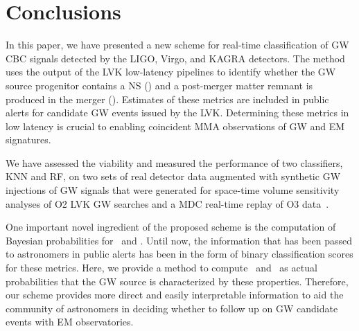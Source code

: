 \section{Conclusions\label{conclusions}}


In this paper, we have presented a new scheme for real-time classification of \ac{GW} \ac{CBC} signals detected by the LIGO, Virgo, and KAGRA detectors. The method uses the
output of the \ac{LVK} low-latency pipelines to identify whether the GW source progenitor contains a \ac{NS} (\hasns) and a post-merger matter remnant is produced in the merger
(\hasrem). Estimates of these metrics are included in public alerts for candidate \ac{GW} events issued by the \ac{LVK}. Determining these metrics in low latency is crucial to
enabling coincident \ac{MMA} observations of GW and \ac{EM} signatures.

We have assessed the viability and measured the performance of two classifiers, \ac{KNN} and \ac{RF}, on two sets of real detector data augmented with synthetic GW injections of
GW signals that were generated for space-time volume sensitivity analyses of \ac{O2} \ac{LVK} \ac{GW} searches  and a \ac{MDC} real-time
replay of \ac{O3} data~\cite{Chaudhary:2023vec}. 


One important novel ingredient of the proposed scheme is the computation of Bayesian probabilities for \hasns\ and \hasrem. Until now, the information that has been passed to
astronomers in public alerts has been in the form of binary classification scores for these metrics. Here, we provide a method to compute \hasns\ and \hasrem\ as actual
probabilities that the \ac{GW} source is characterized by these properties. Therefore, our scheme provides more direct and easily interpretable information to aid the community
of astronomers in deciding whether to follow up on \ac{GW} candidate events with \ac{EM} observatories.


